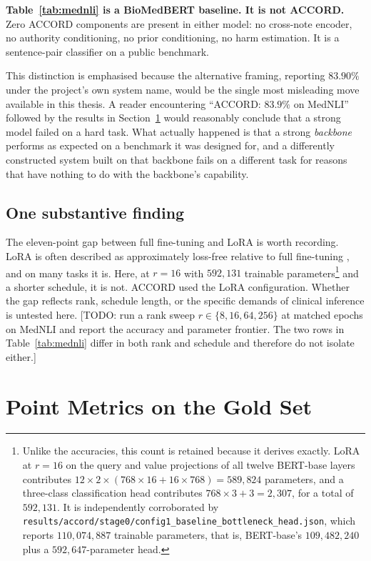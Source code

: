 \textbf{Table~\ref{tab:mednli} is a BioMedBERT baseline. It is not ACCORD.} Zero
ACCORD components are present in either model: no cross-note encoder, no
authority conditioning, no prior conditioning, no harm estimation. It is a
sentence-pair classifier on a public benchmark.

This distinction is emphasised because the alternative framing, reporting
$83.90\%$ under the project's own system name, would be the single most
misleading move available in this thesis. A reader encountering
``ACCORD: $83.9\%$ on MedNLI'' followed by the results in
Section~\ref{sec:eval-point} would reasonably conclude that a strong model
failed on a hard task. What actually happened is that a strong \emph{backbone}
performs as expected on a benchmark it was designed for, and a differently
constructed system built on that backbone fails on a different task for reasons
that have nothing to do with the backbone's capability.

\subsection{One substantive finding}

The eleven-point gap between full fine-tuning and LoRA is worth recording. LoRA
is often described as approximately loss-free relative to full fine-tuning
\citep{hu2022lora}, and on many tasks it is. Here, at $r = 16$ with $592{,}131$
trainable parameters\footnote{Unlike the accuracies, this count is retained
because it derives exactly. LoRA at $r = 16$ on the query and value projections
of all twelve BERT-base layers contributes
$12 \times 2 \times (768 \times 16 + 16 \times 768) = 589{,}824$ parameters, and
a three-class classification head contributes $768 \times 3 + 3 = 2{,}307$, for a
total of $592{,}131$. It is independently corroborated by
\texttt{results/accord/stage0/config1\_baseline\_bottleneck\_head.json}, which
reports $110{,}074{,}887$ trainable parameters, that is, BERT-base's
$109{,}482{,}240$ plus a $592{,}647$-parameter head.} and a shorter schedule, it
is not. ACCORD used the LoRA
configuration. Whether the gap reflects rank, schedule length, or the specific
demands of clinical inference is untested here. [TODO: run a rank sweep
$r \in \{8, 16, 64, 256\}$ at matched epochs on MedNLI and report the
accuracy and parameter frontier. The two rows in Table~\ref{tab:mednli} differ in
both rank and schedule and therefore do not isolate either.]

\section{Point Metrics on the Gold Set}
\label{sec:eval-point}

